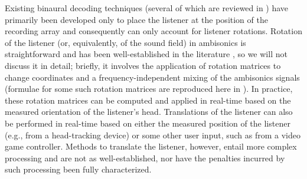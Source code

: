 Existing binaural decoding techniques (several of which are reviewed in ) have primarily been developed only to place the listener at the position of the recording array \citep{McKeagMcGrath1996,Noisternig2003a,Duraiswami2005a,BergeBarrett2010b,Bernschutz2014} and consequently can only account for listener rotations.
Rotation of the listener (or, equivalently, of the sound field) in ambisonics is straightforward and has been well-established in the literature \citep{GumerovDuraiswami2005,Zotter2009PhD}, so we will not discuss it in detail; briefly, it involves the application of rotation matrices to change coordinates and a frequency-independent mixing of the ambisonics signals (formulae for some such rotation matrices are reproduced here in ).
In practice, these rotation matrices can be computed and applied in real-time based on the measured orientation of the listener's head.
Translations of the listener can also be performed in real-time based on either the measured position of the listener (e.g., from a head-tracking device) or some other user input, such as from a video game controller.
Methods to translate the listener, however, entail more complex processing and are not as well-established, nor have the penalties incurred by such processing been fully characterized.

